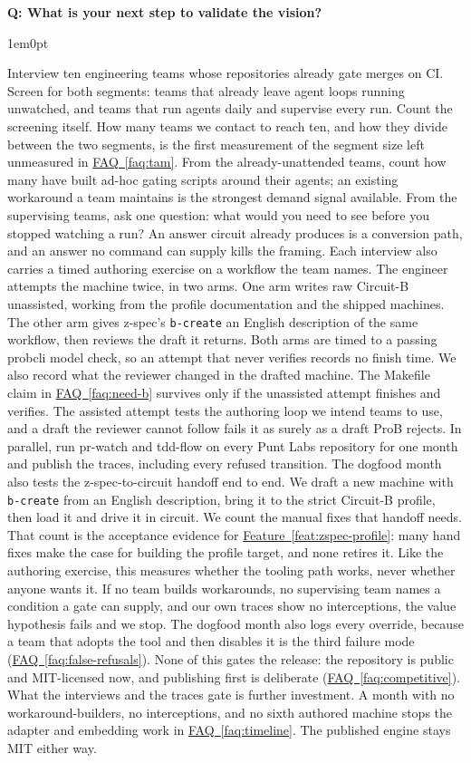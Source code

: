 \documentclass[11pt,letterpaper]{article}
\newcounter{faqnum}
\newenvironment{faqpair}[1]{%
  \needspace{4\baselineskip}%
  \vspace{0.5em}%
  \refstepcounter{faqnum}%
  \noindent\textbf{\color{SectionBlue}Q\thefaqnum: #1}\par\nopagebreak[4]%
  \vspace{0.2em}%
  \begin{adjustwidth}{1em}{0pt}%
  \setlength{\parindent}{0pt}%
}{%
  \end{adjustwidth}%
  \vspace{0.5em}%
}
\newcommand{\faqref}[1]{\hyperref[#1]{FAQ~\ref*{#1}}}
\newcommand{\featureref}[1]{\hyperref[#1]{Feature~\ref*{#1}}}
\begin{document}
\begin{faqpair}{What is your next step to validate the vision?}
\label{faq:next-step}
  Interview ten engineering teams whose repositories already gate merges on CI. Screen for both segments: teams that already leave agent loops running unwatched, and teams that run agents daily and supervise every run. Count the screening itself. How many teams we contact to reach ten, and how they divide between the two segments, is the first measurement of the segment size left unmeasured in \faqref{faq:tam}. From the already-unattended teams, count how many have built ad-hoc gating scripts around their agents; an existing workaround a team maintains is the strongest demand signal available. From the supervising teams, ask one question: what would you need to see before you stopped watching a run? An answer circuit already produces is a conversion path, and an answer no command can supply kills the framing. Each interview also carries a timed authoring exercise on a workflow the team names. The engineer attempts the machine twice, in two arms. One arm writes raw Circuit-B unassisted, working from the profile documentation and the shipped machines. The other arm gives z-spec's \mbox{\texttt{b-create}} an English description of the same workflow, then reviews the draft it returns. Both arms are timed to a passing probcli model check, so an attempt that never verifies records no finish time. We also record what the reviewer changed in the drafted machine. The Makefile claim in \faqref{faq:need-b} survives only if the unassisted attempt finishes and verifies. The assisted attempt tests the authoring loop we intend teams to use, and a draft the reviewer cannot follow fails it as surely as a draft ProB rejects. In parallel, run pr-watch and tdd-flow on every Punt Labs repository for one month and publish the traces, including every refused transition. The dogfood month also tests the z-spec-to-circuit handoff end to end. We draft a new machine with \mbox{\texttt{b-create}} from an English description, bring it to the strict Circuit-B profile, then load it and drive it in circuit. We count the manual fixes that handoff needs. That count is the acceptance evidence for \featureref{feat:zspec-profile}: many hand fixes make the case for building the profile target, and none retires it. Like the authoring exercise, this measures whether the tooling path works, never whether anyone wants it. If no team builds workarounds, no supervising team names a condition a gate can supply, and our own traces show no interceptions, the value hypothesis fails and we stop. The dogfood month also logs every override, because a team that adopts the tool and then disables it is the third failure mode (\faqref{faq:false-refusals}). None of this gates the release: the repository is public and MIT-licensed now, and publishing first is deliberate (\faqref{faq:competitive}). What the interviews and the traces gate is further investment. A month with no workaround-builders, no interceptions, and no sixth authored machine stops the adapter and embedding work in \faqref{faq:timeline}. The published engine stays MIT either way.
\end{faqpair}
\end{document}
